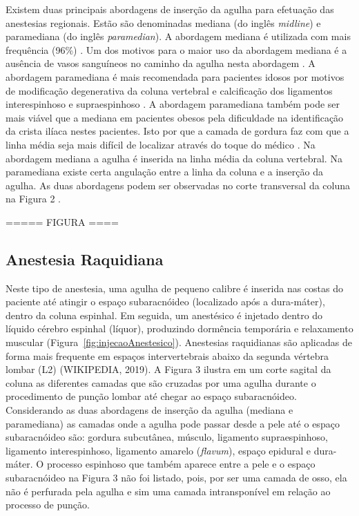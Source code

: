 Existem duas principais abordagens de inserção da agulha para efetuação das anestesias regionais. Estão são denominadas mediana (do inglês \textit{midline}) e paramediana (do inglês \textit{paramedian}). A abordagem mediana é utilizada com mais frequência (96\%) \cite{Wantman2006}. Um dos motivos para o maior uso da abordagem mediana é a ausência de vasos sanguíneos no caminho da agulha nesta abordagem \cite{Bapat2015}. A abordagem paramediana é mais recomendada para pacientes idosos \cite{Ahsan-ul-Haq2005} por motivos de modificação degenerativa da coluna vertebral \cite{Boon2003} e calcificação dos ligamentos interespinhoso e supraespinhoso \cite{Wantman2006}. A abordagem paramediana também pode ser mais viável que a mediana em pacientes obesos pela dificuldade na identificação da crista ilíaca nestes pacientes. Isto por que a camada de gordura faz com que a linha média seja mais difícil de localizar através do toque do médico \cite{N.2013}. Na abordagem mediana a agulha é inserida na linha média da coluna vertebral. Na paramediana existe certa angulação entre a linha da coluna e a inserção da agulha. As duas abordagens podem ser observadas no corte transversal da coluna na Figura 2 \cite{MedBroadcast2018}. 

===== FIGURA ====

\subsection{Anestesia Raquidiana}

Neste tipo de anestesia, uma agulha de pequeno calibre é inserida nas costas do paciente até atingir o espaço subaracnóideo (localizado após a dura-máter), dentro da coluna espinhal. Em seguida, um anestésico é injetado dentro do líquido cérebro espinhal (líquor), produzindo dormência temporária e relaxamento muscular (Figura~\ref{fig:injecaoAnestesico}). Anestesias raquidianas são aplicadas de forma mais frequente em espaços intervertebrais abaixo da segunda vértebra lombar (L2) (WIKIPEDIA, 2019). A Figura 3 ilustra em um corte sagital da coluna as diferentes camadas que são cruzadas por uma agulha durante o procedimento de punção lombar até chegar ao espaço subaracnóideo. Considerando as duas abordagens de inserção da agulha (mediana e paramediana) as camadas onde a agulha pode passar desde a pele até o espaço subaracnóideo são: gordura subcutânea, músculo, ligamento supraespinhoso, ligamento interespinhoso, ligamento amarelo (\textit{flavum}), espaço epidural e dura-máter. O processo espinhoso que também aparece entre a pele e o espaço subaracnóideo na Figura 3 não foi listado, pois, por ser uma camada de osso, ela não é perfurada pela agulha e sim uma camada intransponível em relação ao processo de punção.

